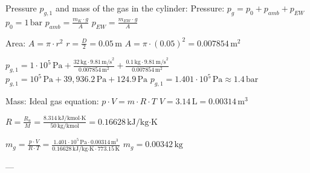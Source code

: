 Pressure \( p_{g,1} \) and mass of the gas in the cylinder:  
Pressure:  
\( p_g = p_0 + p_{amb} + p_{EW} \)  
\( p_0 = 1 \, \text{bar} \)  
\( p_{amb} = \frac{m_K \cdot g}{A} \)  
\( p_{EW} = \frac{m_{EW} \cdot g}{A} \)  

Area:  
\( A = \pi \cdot r^2 \)  
\( r = \frac{D}{2} = 0.05 \, \text{m} \)  
\( A = \pi \cdot (0.05)^2 = 0.007854 \, \text{m}^2 \)  

\( p_{g,1} = 1 \cdot 10^5 \, \text{Pa} + \frac{32 \, \text{kg} \cdot 9.81 \, \text{m/s}^2}{0.007854 \, \text{m}^2} + \frac{0.1 \, \text{kg} \cdot 9.81 \, \text{m/s}^2}{0.007854 \, \text{m}^2} \)  
\( p_{g,1} = 10^5 \, \text{Pa} + 39,936.2 \, \text{Pa} + 124.9 \, \text{Pa} \)  
\( p_{g,1} = 1.401 \cdot 10^5 \, \text{Pa} \approx 1.4 \, \text{bar} \)  

Mass:  
Ideal gas equation:  
\( p \cdot V = m \cdot R \cdot T \)  
\( V = 3.14 \, \text{L} = 0.00314 \, \text{m}^3 \)  

\( R = \frac{R_u}{M} = \frac{8.314 \, \text{kJ/kmol·K}}{50 \, \text{kg/kmol}} = 0.16628 \, \text{kJ/kg·K} \)  

\( m_g = \frac{p \cdot V}{R \cdot T} = \frac{1.401 \cdot 10^5 \, \text{Pa} \cdot 0.00314 \, \text{m}^3}{0.16628 \, \text{kJ/kg·K} \cdot 773.15 \, \text{K}} \)  
\( m_g = 0.00342 \, \text{kg} \)  

---